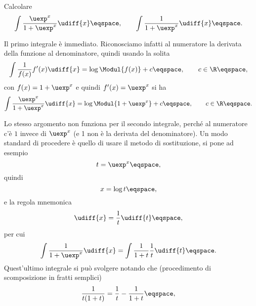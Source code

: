 


\begin{Exercise}
Calcolare
\begin{displaymath}
\int \frac{\uexp^{x}}{1+\uexp^{x}} \udiff{x} \eqspace ,\qquad
\int \frac{1}{1+\uexp^{x}} \udiff{x} \eqspace .
\end{displaymath}
\end{Exercise}
\begin{Solution}
Il primo integrale \`e immediato. Riconosciamo infatti al numeratore la derivata
della funzione al denominatore, quindi usando la solita
\begin{displaymath}
\int \frac{1}{f(x)}f^{\prime}(x) \udiff{x} = \log \Modul{f(x)} + c \eqspace, \qquad
c\in\R \eqspace, 
\end{displaymath}
con $f(x) = 1+ \uexp^{x}$ e quindi $f^{\prime}(x)  = \uexp^{x}$ si ha
\begin{displaymath}
\int \frac{\uexp^{x}}{1+\uexp^{x}} \udiff{x} = \log \Modul {1+\uexp^{x}} + c
\eqspace, \qquad c \in \R \eqspace .
\end{displaymath}
\par 
Lo stesso argomento non funziona per il secondo integrale, perch\'e al
numeratore c'\`e $1$ invece di $\uexp^{x}$ (e 1 non \`e la derivata del
denominatore).  Un modo standard di procedere \`e quello di usare il metodo di
sostituzione, si pone ad esempio 
\begin{displaymath}
t = \uexp^{x} \eqspace, 
\end{displaymath}
quindi 
\begin{displaymath}
x = \log t \eqspace ,
\end{displaymath}
 e la regola mnemonica
\begin{displaymath}
\udiff{x} = \frac{1}{t} \udiff{t} \eqspace, 
\end{displaymath}
per cui
\begin{displaymath}
\int \frac{1}{1+\uexp^{x}} \udiff{x} = \int \frac{1}{1+t} \frac{1}{t} \udiff{t}
\eqspace .
\end{displaymath}
Quest'ultimo integrale si pu\`o svolgere notando che (procedimento di
scomposizione in fratti semplici) 
\begin{displaymath}
\frac{1}{t (1+t)} =  \frac{1}{t} - \frac{1}{1+t} 
\eqspace ,

\end{displaymath}
\end{Solution}
